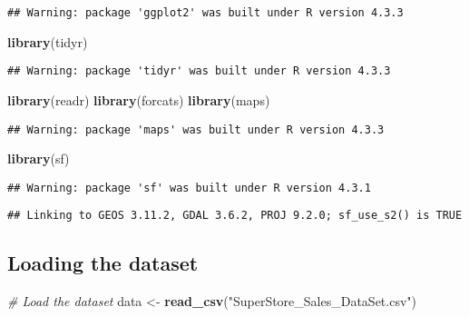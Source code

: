 \documentclass[
]{article}
\newenvironment{Shaded}{\begin{snugshade}}{\end{snugshade}}
\newcommand{\CommentTok}[1]{\textcolor[rgb]{0.56,0.35,0.01}{\textit{#1}}}
\newcommand{\FunctionTok}[1]{\textcolor[rgb]{0.13,0.29,0.53}{\textbf{#1}}}
\newcommand{\NormalTok}[1]{#1}
\newcommand{\OtherTok}[1]{\textcolor[rgb]{0.56,0.35,0.01}{#1}}
\newcommand{\StringTok}[1]{\textcolor[rgb]{0.31,0.60,0.02}{#1}}
\begin{document}
\begin{verbatim}
## Warning: package 'ggplot2' was built under R version 4.3.3
\end{verbatim}

\begin{Shaded}
\begin{Highlighting}[]
\FunctionTok{library}\NormalTok{(tidyr)}
\end{Highlighting}
\end{Shaded}

\begin{verbatim}
## Warning: package 'tidyr' was built under R version 4.3.3
\end{verbatim}

\begin{Shaded}
\begin{Highlighting}[]
\FunctionTok{library}\NormalTok{(readr)}
\FunctionTok{library}\NormalTok{(forcats)}
\FunctionTok{library}\NormalTok{(maps)}
\end{Highlighting}
\end{Shaded}

\begin{verbatim}
## Warning: package 'maps' was built under R version 4.3.3
\end{verbatim}

\begin{Shaded}
\begin{Highlighting}[]
\FunctionTok{library}\NormalTok{(sf)}
\end{Highlighting}
\end{Shaded}

\begin{verbatim}
## Warning: package 'sf' was built under R version 4.3.1
\end{verbatim}

\begin{verbatim}
## Linking to GEOS 3.11.2, GDAL 3.6.2, PROJ 9.2.0; sf_use_s2() is TRUE
\end{verbatim}

\hypertarget{loading-the-dataset}{%
\subsection{Loading the dataset}\label{loading-the-dataset}}

\begin{Shaded}
\begin{Highlighting}[]
\CommentTok{\# Load the dataset}
\NormalTok{data }\OtherTok{\textless{}{-}} \FunctionTok{read\_csv}\NormalTok{(}\StringTok{"SuperStore\_Sales\_DataSet.csv"}\NormalTok{)}
\end{Highlighting}
\end{Shaded}
\end{document}
